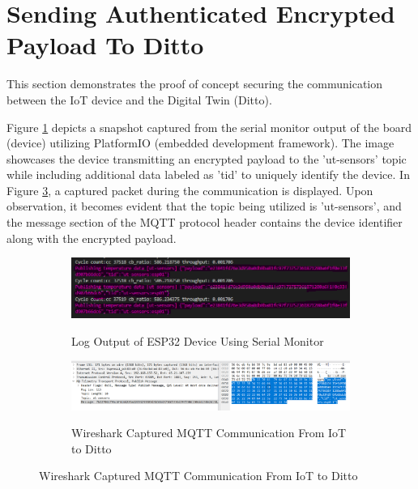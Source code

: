 \section{Sending Authenticated Encrypted Payload To Ditto}

This section demonstrates the proof of concept securing the communication between the IoT device and the Digital Twin (Ditto). 

Figure \ref{fig:log-mon} depicts a snapshot captured from the serial monitor output of the board (device) utilizing PlatformIO (embedded development framework). The image showcases the device transmitting an encrypted payload to the 'ut-sensors' topic while including additional data labeled as 'tid' to uniquely identify the device. In Figure \ref{fig:wireshark}, a captured packet during the communication is displayed. Upon observation, it becomes evident that the topic being utilized is 'ut-sensors', and the message section of the MQTT protocol header contains the device identifier along with the encrypted payload.


\begin{figure}[H]
    \caption{Serial Monitor of ESP32 Board and Wireshark Capturing Communication Between The Device and Ditto(DT)}
    \begin{subfigure}[c]{1\linewidth}
        \centering
        \caption{Log Output of ESP32 Device Using Serial Monitor}
        \includegraphics[width=\linewidth]{images/fp/serialport.png}
        \label{fig:log-mon}
     \end{subfigure}    

    \begin{subfigure}[c]{1\linewidth}
        \centering
        \caption{Wireshark Captured MQTT Communication From IoT to Ditto}
        \includegraphics[width=\linewidth]{images/fp/wireshark.png}
        \label{fig:wireshark}
    \end{subfigure}
\end{figure}

